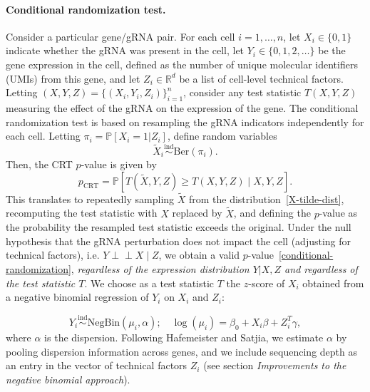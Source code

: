 \documentclass{article}
\newcommand\independent{\perp \!\!\! \perp}
\begin{document}
\paragraph{Conditional randomization test.}
Consider a particular gene/gRNA pair. For each cell $i = 1, \dots, n$, let $X_i \in \{0,1\}$ indicate whether the gRNA was present in the cell, let $Y_i \in \{0,1,2,\dots\}$ be the gene expression in the cell, defined as the number of unique molecular identifiers (UMIs) from this gene, and let $Z_i \in \mathbb R^d$ be a list of cell-level technical factors. Letting $(X, Y, Z) = \{(X_i, Y_i, Z_i)\}_{i = 1}^{n}$, consider any test statistic $T(X,Y,Z)$ measuring the effect of the gRNA on the expression of the gene. The conditional randomization test\cite{CetL16} is based on resampling the gRNA indicators independently for each cell. Letting $\pi_i = \mathbb P[X_i = 1 | Z_i]$, define random variables
\begin{equation}
\widetilde X_i \overset{\text{ind}}\sim \text{Ber}(\pi_i). 
\label{X-tilde-dist}
\end{equation}
Then, the CRT $p$-value is given by
\begin{equation}
p_{\text{CRT}} = \mathbb P[T(\widetilde X, Y, Z) \geq T(X,Y,Z)\mid X,Y,Z].
\label{conditional-randomization}
\end{equation}
This translates to repeatedly sampling $\widetilde X$ from the distribution~\eqref{X-tilde-dist}, recomputing the test statistic with $X$ replaced by $\widetilde X$, and defining the $p$-value as the probability the resampled test statistic exceeds the original. Under the null hypothesis that the gRNA perturbation does not impact the cell (adjusting for technical factors), i.e. $Y \independent X \mid Z$, we obtain a valid $p$-value~\eqref{conditional-randomization}, \textit{regardless of the expression distribution $Y|X,Z$ and regardless of the test statistic $T$}. We choose as a test statistic $T$ the $z$-score of $X_i$ obtained from a negative binomial regression of $Y_i$ on $X_i$ and $Z_i$:

\begin{equation}
Y_i \overset{\text{ind}} \sim \text{NegBin}(\mu_i, \alpha); \quad \log(\mu_i) = \beta_0 + X_i \beta + Z_i^T \gamma
\label{negative-binomial},
\end{equation}
where $\alpha$ is the dispersion. Following Hafemeister and Satjia\cite{Hafemeister2019}, we estimate $\alpha$ by pooling dispersion information across genes, and we include sequencing depth as an entry in the vector of technical factors  $Z_i$ (see section \textit{Improvements to the negative binomial approach}).
\end{document}
